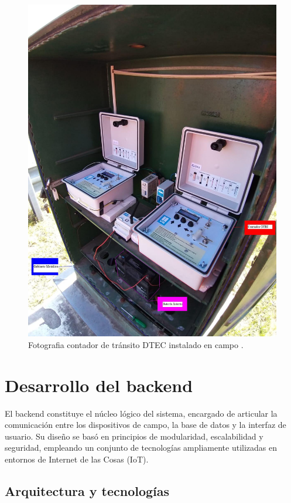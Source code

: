 \begin{figure}[htbp]
  \centering
  \includegraphics[width=0.90\linewidth]{./Figures/fotoGabinete.jpeg}
  \caption{Fotografia contador de tránsito DTEC instalado en campo \protect\footnotemark.}
  \label{fig:foto_gabinete}
\end{figure}



\section{Desarrollo del backend}

El backend constituye el núcleo lógico del sistema, encargado de articular la comunicación entre los dispositivos de campo, la base de datos y la interfaz de usuario. Su diseño se basó en principios de modularidad, escalabilidad y seguridad, empleando un conjunto de tecnologías ampliamente utilizadas en entornos de Internet de las Cosas (IoT).


\subsection{Arquitectura y tecnologías}

